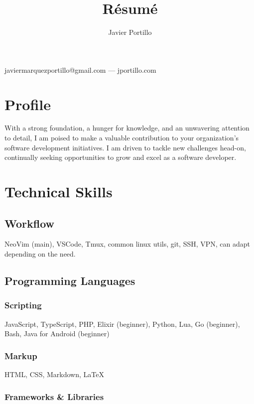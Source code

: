 \documentclass{article}
\makeatletter
\renewcommand{\maketitle}{
	\begin{center}
    {\huge\bfseries\theauthor}
    
    \vspace{.5em}

    javiermarquezportillo@gmail.com --- jportillo.com
	\end{center}
}
\makeatother
\begin{document}
\title{R\'esum\'e}
\author{Javier Portillo}

\maketitle

\section{Profile}

With a strong foundation, a hunger for knowledge, and an unwavering attention to detail, I am poised to make a valuable contribution to your organization's software development initiatives. I am driven to tackle new challenges head-on, continually seeking opportunities to grow and excel as a software developer.

\section{Technical Skills}

\subsection{Workflow}

NeoVim (main), VSCode, Tmux, common linux utils, git, SSH, VPN, can adapt depending on the need.

\subsection{Programming Languages}

\subsubsection{Scripting}

JavaScript, TypeScript, PHP, Elixir (beginner), Python, Lua, Go (beginner), Bash, Java for Android (beginner)

\subsubsection{Markup}

HTML, CSS, Markdown, \LaTeX{}

\subsubsection{Frameworks \& Libraries}
\end{document}
